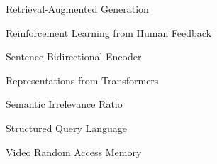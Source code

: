 \documentclass[12pt, onehalfspacing, liststotoc, oneside, parskip, headsepline,UKenglish]{UMaT_Undergrauate_Report_Template_Configurations}
\begin{document}
\begin{description}[style=nextline,leftmargin=4.5cm,labelwidth=4cm,font=\normalfont,itemsep=-1.5ex]
  \item[RAG]\hspace{0.1\textwidth} Retrieval-Augmented Generation
  \item[RLHF]\hspace{0.1\textwidth} Reinforcement Learning from Human Feedback
  \item[SBERT]\hspace{0.1\textwidth} Sentence Bidirectional Encoder
  \item[] \hspace{0.1\textwidth} Representations from Transformers
  \item[SIR]\hspace{0.1\textwidth} Semantic Irrelevance Ratio
  \item[SQL]\hspace{0.1\textwidth} Structured Query Language
  \item[VRAM]\hspace{0.1\textwidth} Video Random Access Memory

\end{description}


\mainmatter

\pagestyle{thesis}


\renewcommand{\bibname}{\large\vspace{15pt} References}
\printbibliography

\end{document}
